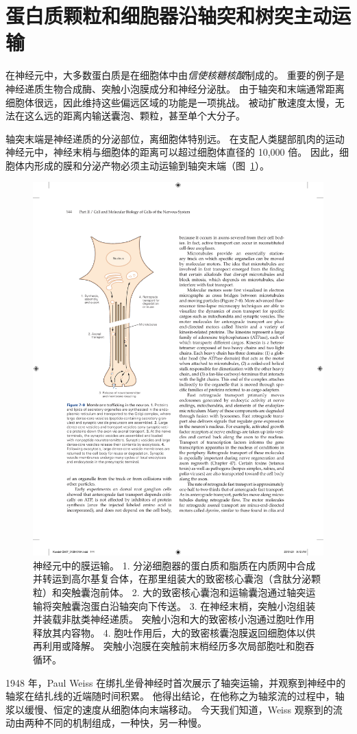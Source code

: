 \section{蛋白质颗粒和细胞器沿轴突和树突主动运输}

在神经元中，大多数蛋白质是在细胞体中由\textit{信使核糖核酸}制成的。
重要的例子是神经递质生物合成酶、突触小泡膜成分和神经分泌肽。
由于轴突和末端通常距离细胞体很远，因此维持这些偏远区域的功能是一项挑战。
被动扩散速度太慢，无法在这么远的距离内输送囊泡、颗粒，甚至单个大分子。


轴突末端是神经递质的分泌部位，离细胞体特别远。
在支配人类腿部肌肉的运动神经元中，神经末梢与细胞体的距离可以超过细胞体直径的 10,000 倍。
因此，细胞体内形成的膜和分泌产物必须主动运输到轴突末端（图~\ref{fig:7_9}）。


\begin{figure}[htbp]
	\centering
	\includegraphics[width=0.5\linewidth]{chap07/fig_7_9}
	\caption{神经元中的膜运输。 1. 分泌细胞器的蛋白质和脂质在内质网中合成并转运到高尔基复合体，在那里组装大的致密核心囊泡（含肽分泌颗粒）和突触囊泡前体。 2. 大的致密核心囊泡和运输囊泡通过轴突运输将突触囊泡蛋白沿轴突向下传送。 3. 在神经末梢，突触小泡组装并装载非肽类神经递质。 突触小泡和大的致密核小泡通过胞吐作用释放其内容物。 4. 胞吐作用后，大的致密核囊泡膜返回细胞体以供再利用或降解。 突触小泡膜在突触前末梢经历多次局部胞吐和胞吞循环。}
	\label{fig:7_9}
\end{figure}


1948 年，Paul Weiss 在绑扎坐骨神经时首次展示了轴突运输，并观察到神经中的轴浆在结扎线的近端随时间积累。
他得出结论，在他称之为轴浆流的过程中，轴浆以缓慢、恒定的速度从细胞体向末端移动。
今天我们知道，Weiss 观察到的流动由两种不同的机制组成，一种快，另一种慢。


